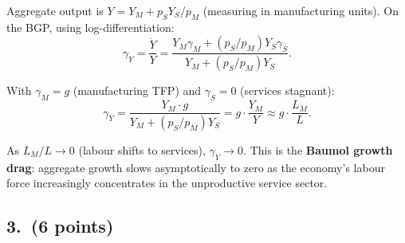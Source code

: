 \documentclass[a4paper,11pt]{article}
\begin{document}
\begin{answerbox}
Aggregate output is $Y = Y_M + p_S Y_S/p_M$ (measuring in manufacturing units). On the BGP, using log-differentiation:
\[
    \gamma_Y = \frac{\dot{Y}}{Y} = \frac{Y_M \gamma_M + (p_S/p_M)Y_S\gamma_S}{Y_M + (p_S/p_M)Y_S}.
\]

With $\gamma_M = g$ (manufacturing TFP) and $\gamma_S = 0$ (services stagnant):
\[
    \gamma_Y = \frac{Y_M \cdot g}{Y_M + (p_S/p_M)Y_S} = g \cdot \frac{Y_M}{Y} \approx \boxed{g \cdot \frac{L_M}{L}.}
\]

As $L_M/L \to 0$ (labour shifts to services), $\gamma_Y \to 0$. This is the \textbf{Baumol growth drag}: aggregate growth slows asymptotically to zero as the economy's labour force increasingly concentrates in the unproductive service sector.
\end{answerbox}

\subsection*{3.\ (6 points)}
\end{document}
